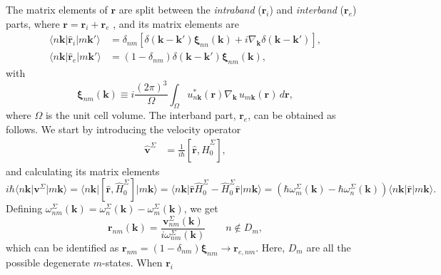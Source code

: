 The matrix elements of $\mathbf{r}$ are split between the
\emph{intraband} ($\mathbf{r}_{i}$) and \emph{interband} ($\mathbf{r}_{e}$)
parts, where $\mathbf{r} = \mathbf{r}_{i} + \mathbf{r}_{e}$
\cite{adamsJCP53, blountSSP62}, and its matrix elements are \cite{aversaPRB95}
\begin{align}\label{rnminn}
\langle n\mathbf{k}\vert \hat{\mathbf{r}}_{i} |m\mathbf{k}'\rangle 
&= \delta_{nm}
\left[
  \delta(\mathbf{k} - \mathbf{k}')\boldsymbol{\xi}_{nn}(\mathbf{k})
+ i\nabla_{\mathbf{k}}\delta(\mathbf{k} - \mathbf{k}')
\right],\\
\langle n\mathbf{k}| \hat{\mathbf{r}}_{e} |m\mathbf{k}'\rangle 
&= (1- \delta_{nm})\delta(\mathbf{k}-\mathbf{k}')
   \boldsymbol{\xi}_{nm}(\mathbf{k}),\label{rnmenn}
\end{align}
with
\begin{equation}\label{zetann}
\boldsymbol{\xi}_{nm}(\mathbf{k})
\equiv i\frac{(2\pi)^3}{\Omega}
\int_{\Omega}u^{*}_{n\mathbf{k}}(\mathbf{r})
\nabla_{\mathbf{k}}\,u_{m\mathbf{k}}(\mathbf{r})
\,d\mathbf{r},
\end{equation}
where $\Omega$ is the unit cell volume. The interband part, $\mathbf{r}_{e}$,
can be obtained as follows. We start by introducing the velocity operator
\begin{align}\label{vop}
\hat{\mathbf{v}}^{\Sigma} &=
\frac{1}{i\hbar}\left[\hat{\mathbf{r}},\hat{H}^{\Sigma}_{0}\right],
\end{align}
and calculating its matrix elements
\begin{equation}\label{conhrnm}
i\hbar\langle n\mathbf{k}\vert\mathbf{v}^\Sigma\vert m\mathbf{k}\rangle
= \langle n\mathbf{k}\vert
\left[
\hat{\mathbf{r}}, \hat{H}^{\Sigma}_{0}
\right]
  \vert m\mathbf{k}\rangle
= \langle n\mathbf{k}\vert
\hat{\mathbf{r}}\hat{H}^{\Sigma}_{0} - \hat{H}^{\Sigma}_{0}\hat{\mathbf{r}}
\vert m\mathbf{k}\rangle
=
\left(
\hbar\omega^{\Sigma}_{m}(\mathbf{k}) - \hbar\omega^{\Sigma}_{n}(\mathbf{k})
\right)
\langle n\mathbf{k}\vert\hat{\mathbf{r}}\vert m\mathbf{k}\rangle.
\end{equation}
Defining $\omega^\Sigma_{nm}(\mathbf{k}) =
\omega^{\Sigma}_{n}(\mathbf{k}) - \omega^\Sigma_m(\mathbf{k})$, we get
\begin{equation}\label{pmnrmn}
\mathbf{r}_{nm}(\mathbf{k})
= \frac{\mathbf{v}^\Sigma_{nm}(\mathbf{k})}{i\omega^\Sigma_{nm}(\mathbf{k})}
\qquad n\notin D_{m},
\end{equation} 
which can be identified as
$\mathbf{r}_{nm}=(1-\delta_{nm})\boldsymbol{\xi}_{nm}\to \mathbf{r}_{e,nm}$.
Here, $D_m$ are all the possible degenerate $m$-states. When $\mathbf{r}_{i}$
